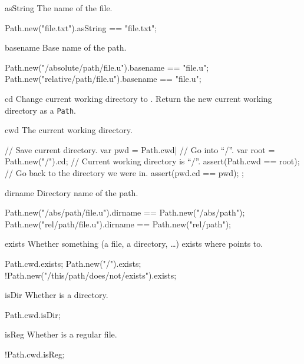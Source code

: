 \begin{urbiscriptapi}
\item[asString]
  The name of the file.
\begin{urbiassert}
Path.new("file.txt").asString == "file.txt";
\end{urbiassert}


\item[basename]
  Base name of the path.
\begin{urbiassert}
Path.new("/absolute/path/file.u").basename == "file.u";
Path.new("relative/path/file.u").basename  == "file.u";
\end{urbiassert}


\item[cd]
  Change current working directory to \this. Return the new
  current working directory as a \lstinline|Path|.


\item[cwd]
  The current working directory.
\begin{urbiscript}
{
  // Save current directory.
  var pwd = Path.cwd|
  // Go into ``/''.
  var root = Path.new("/").cd;
  // Current working directory is ``/''.
  assert(Path.cwd == root);
  // Go back to the directory we were in.
  assert(pwd.cd == pwd);
};
\end{urbiscript}


\item[dirname]%
  Directory name of the path.
\begin{urbiassert}
Path.new("/abs/path/file.u").dirname == Path.new("/abs/path");
Path.new("rel/path/file.u").dirname  == Path.new("rel/path");
\end{urbiassert}


\item[exists]%
  Whether something (a file, a directory, \ldots) exists where
  \this points to.
\begin{urbiassert}
Path.cwd.exists;
Path.new("/").exists;
!Path.new("/this/path/does/not/exists").exists;
\end{urbiassert}


\item[isDir]%
  Whether \this is a directory.
\begin{urbiassert}
Path.cwd.isDir;
\end{urbiassert}


\item[isReg]%
  Whether \this is a regular file.
\begin{urbiassert}
!Path.cwd.isReg;
\end{urbiassert}



\end{urbiscriptapi}
